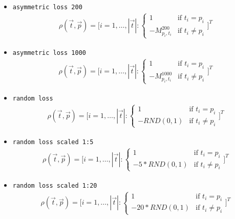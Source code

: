 \documentclass[twoside,11pt]{article}
\begin{document}
\begin{itemize}
  \item \texttt{asymmetric loss 200}
    \begin{align*}
      \rho(\vec{t}, \vec{p}) = \Bigg[
      i=1,\dots,|\vec{t}|:
      \begin{cases}
        1  &\text{if } t_i = p_i \\
        -M^{200}_{p_i,t_i} &\text{if } t_i \neq p_i
      \end{cases} \Bigg]^T
    \end{align*}

  \item \texttt{asymmetric loss 1000}
    \begin{align*}
      \rho(\vec{t}, \vec{p}) = \Bigg[
      i=1,\dots,|\vec{t}|:
      \begin{cases}
        1  &\text{if } t_i = p_i \\
        -M^{1000}_{p_i,t_i} &\text{if } t_i \neq p_i
      \end{cases} \Bigg]^T
    \end{align*}

  \item \texttt{random loss}
    \begin{align*}
      \rho(\vec{t}, \vec{p}) = \Bigg[
      i=1,\dots,|\vec{t}|:
      \begin{cases}
        1  &\text{if } t_i = p_i \\
        -RND(0,1) &\text{if } t_i \neq p_i
      \end{cases} \Bigg]^T
    \end{align*}

  \item \texttt{random loss scaled 1:5}
    \begin{align*}
      \rho(\vec{t}, \vec{p}) = \Bigg[
      i=1,\dots,|\vec{t}|:
      \begin{cases}
        1  &\text{if } t_i = p_i \\
        -5*RND(0,1) &\text{if } t_i \neq p_i
      \end{cases} \Bigg]^T
    \end{align*}

  \item \texttt{random loss scaled 1:20}
    \begin{align*}
      \rho(\vec{t}, \vec{p}) = \Bigg[
      i=1,\dots,|\vec{t}|:
      \begin{cases}
        1  &\text{if } t_i = p_i \\
        -20 * RND(0,1) &\text{if } t_i \neq p_i
      \end{cases} \Bigg]^T
    \end{align*}


\end{itemize}
\end{document}
